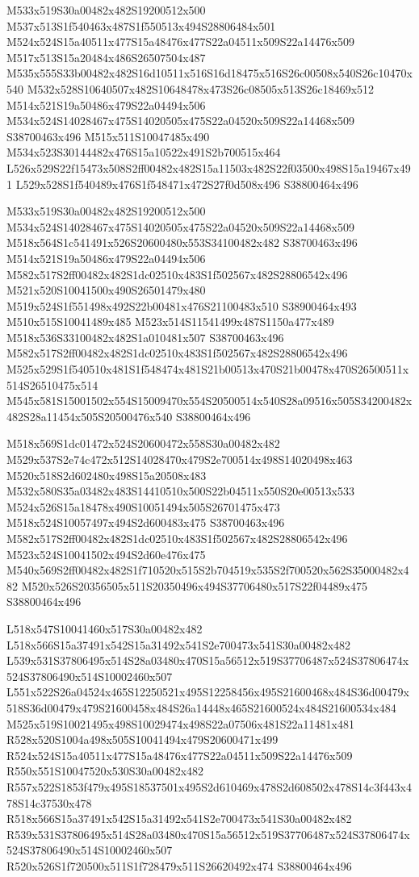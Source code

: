 \documentclass{article}
\begin{document}
\begin{multicols}{2}
M533x519S30a00482x482S19200512x500 M537x513S1f540463x487S1f550513x494S28806484x501 M524x524S15a40511x477S15a48476x477S22a04511x509S22a14476x509 M517x513S15a20484x486S26507504x487 M535x555S33b00482x482S16d10511x516S16d18475x516S26c00508x540S26c10470x540 M532x528S10640507x482S10648478x473S26c08505x513S26c18469x512 M514x521S19a50486x479S22a04494x506 M534x524S14028467x475S14020505x475S22a04520x509S22a14468x509 S38700463x496 M515x511S10047485x490 M534x523S30144482x476S15a10522x491S2b700515x464 L526x529S22f15473x508S2ff00482x482S15a11503x482S22f03500x498S15a19467x491 L529x528S1f540489x476S1f548471x472S27f0d508x496 S38800464x496

M533x519S30a00482x482S19200512x500 M534x524S14028467x475S14020505x475S22a04520x509S22a14468x509 M518x564S1c541491x526S20600480x553S34100482x482 S38700463x496 M514x521S19a50486x479S22a04494x506 M582x517S2ff00482x482S1dc02510x483S1f502567x482S28806542x496 M521x520S10041500x490S26501479x480 M519x524S1f551498x492S22b00481x476S21100483x510 S38900464x493 M510x515S10041489x485 M523x514S11541499x487S1150a477x489 M518x536S33100482x482S1a010481x507 S38700463x496 M582x517S2ff00482x482S1dc02510x483S1f502567x482S28806542x496 M525x529S1f540510x481S1f548474x481S21b00513x470S21b00478x470S26500511x514S26510475x514 M545x581S15001502x554S15009470x554S20500514x540S28a09516x505S34200482x482S28a11454x505S20500476x540 S38800464x496

M518x569S1dc01472x524S20600472x558S30a00482x482 M529x537S2e74c472x512S14028470x479S2e700514x498S14020498x463 M520x518S2d602480x498S15a20508x483 M532x580S35a03482x483S14410510x500S22b04511x550S20e00513x533 M524x526S15a18478x490S10051494x505S26701475x473 M518x524S10057497x494S2d600483x475 S38700463x496 M582x517S2ff00482x482S1dc02510x483S1f502567x482S28806542x496 M523x524S10041502x494S2d60e476x475 M540x569S2ff00482x482S1f710520x515S2b704519x535S2f700520x562S35000482x482 M520x526S20356505x511S20350496x494S37706480x517S22f04489x475 S38800464x496

L518x547S10041460x517S30a00482x482 L518x566S15a37491x542S15a31492x541S2e700473x541S30a00482x482 L539x531S37806495x514S28a03480x470S15a56512x519S37706487x524S37806474x524S37806490x514S10002460x507 L551x522S26a04524x465S12250521x495S12258456x495S21600468x484S36d00479x518S36d00479x479S21600458x484S26a14448x465S21600524x484S21600534x484 M525x519S10021495x498S10029474x498S22a07506x481S22a11481x481 R528x520S1004a498x505S10041494x479S20600471x499 R524x524S15a40511x477S15a48476x477S22a04511x509S22a14476x509 R550x551S10047520x530S30a00482x482 R557x522S1853f479x495S18537501x495S2d610469x478S2d608502x478S14c3f443x478S14c37530x478 R518x566S15a37491x542S15a31492x541S2e700473x541S30a00482x482 R539x531S37806495x514S28a03480x470S15a56512x519S37706487x524S37806474x524S37806490x514S10002460x507 R520x526S1f720500x511S1f728479x511S26620492x474 S38800464x496


\end{multicols}
\end{document}
